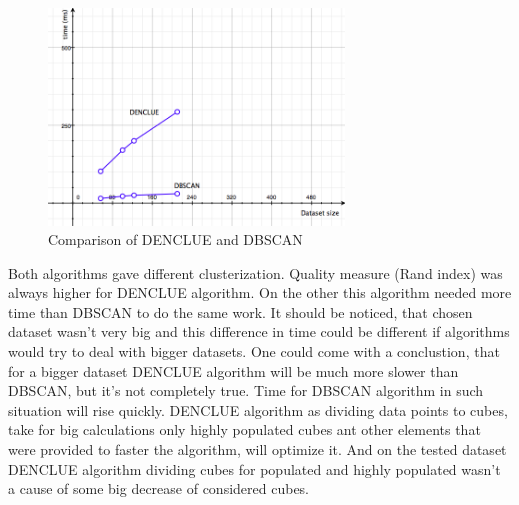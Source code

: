 \documentclass[12pt, a4paper, notitlepage, oneside]{article}
\begin{document}
\begin{figure}[!ht]
 	\centering
	\includegraphics[width=0.7\textwidth]{images/comparison_time.png}
 	\caption[]
	{Comparison of DENCLUE and DBSCAN}
		\label{comparison_time}
\end{figure}

Both algorithms gave different clusterization.
Quality measure (Rand index) was always higher for DENCLUE algorithm.
On the other this algorithm needed more time than DBSCAN to do the same work. 
It should be noticed, that chosen dataset wasn't very big and this difference in time could be different if 
algorithms would try to deal with bigger datasets. 
One could come with a conclustion, that for a bigger dataset DENCLUE algorithm will be much more slower 
than DBSCAN, but it's not completely true. 
Time for DBSCAN algorithm in such situation will rise quickly. 
DENCLUE algorithm as dividing data points to cubes, take for big calculations only highly populated cubes ant other 
elements that were provided to faster the algorithm, will optimize it. 
And on the tested dataset DENCLUE algorithm dividing cubes for populated and 
highly populated wasn't a cause of some big decrease of considered cubes. 

\newpage



\end{document}
